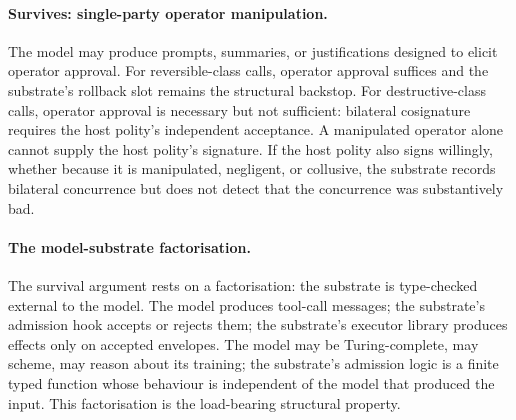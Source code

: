 \paragraph{Survives: single-party operator manipulation.}
The model may produce prompts, summaries, or justifications designed to elicit operator approval. For reversible-class calls, operator approval suffices and the substrate's rollback slot remains the structural backstop. For destructive-class calls, operator approval is necessary but not sufficient: bilateral cosignature requires the host polity's independent acceptance. A manipulated operator alone cannot supply the host polity's signature. If the host polity also signs willingly, whether because it is manipulated, negligent, or collusive, the substrate records bilateral concurrence but does not detect that the concurrence was substantively bad.

\paragraph{The model-substrate factorisation.}
The survival argument rests on a factorisation: the substrate is type-checked external to the model. The model produces tool-call messages; the substrate's admission hook accepts or rejects them; the substrate's executor library produces effects only on accepted envelopes. The model may be Turing-complete, may scheme, may reason about its training; the substrate's admission logic is a finite typed function whose behaviour is independent of the model that produced the input. This factorisation is the load-bearing structural property.

